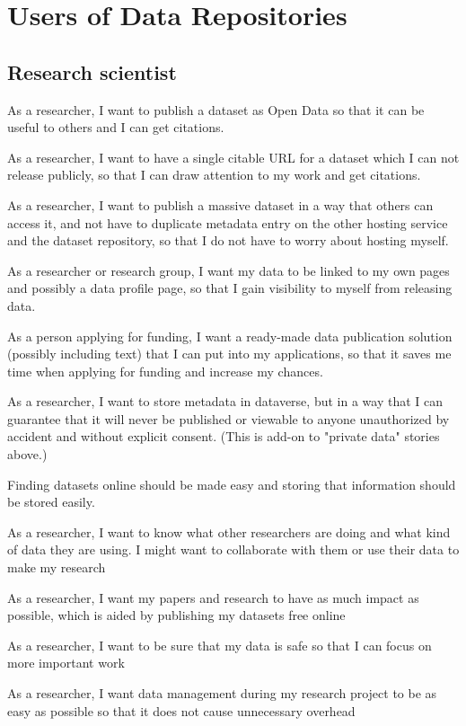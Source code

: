 \chapter{Users of Data Repositories}
\label{chapter:first-appendix}

\section{Research scientist}

\begin{compactitem}
    \item As a researcher, I want to publish a dataset as Open Data so that it
          can be useful to others and I can get citations.
    \item As a researcher, I want to have a single citable URL for a dataset
          which I can not release publicly, so that I can draw attention to my
          work and get citations. 
    \item As a researcher, I want to publish a massive dataset in a way that
          others can access it, and not have to duplicate metadata entry on the
          other hosting service and the dataset repository, so that I do not have
          to worry about hosting myself. 
    \item As a researcher or research group, I want my data to be linked to my
          own pages and possibly a data profile page, so that I gain visibility
          to myself from releasing data. 
    \item As a person applying for funding, I want a ready-made data publication
          solution (possibly including text) that I can put into my
          applications, so that it saves me time when applying for funding and
          increase my chances. 
    \item As a researcher, I want to store metadata in dataverse, but in a way
          that I can guarantee that it will never be published or viewable to
          anyone unauthorized by accident and without explicit consent.  (This
          is add-on to "private data" stories above.)
    \item Finding datasets online should be made easy and storing that information
          should be stored easily.
    \item As a researcher, I want to know what other researchers are doing and
          what kind of data they are using. I might want to collaborate with
          them or use their data to make my research
    \item As a researcher, I want my papers and research to have as much impact
          as possible, which is aided by publishing my datasets free online
    \item As a researcher, I want to be sure that my data is safe so that I can
          focus on more important work
    \item As a researcher, I want data management during my research project to
          be as easy as possible so that it does not cause unnecessary overhead
\end{compactitem}

